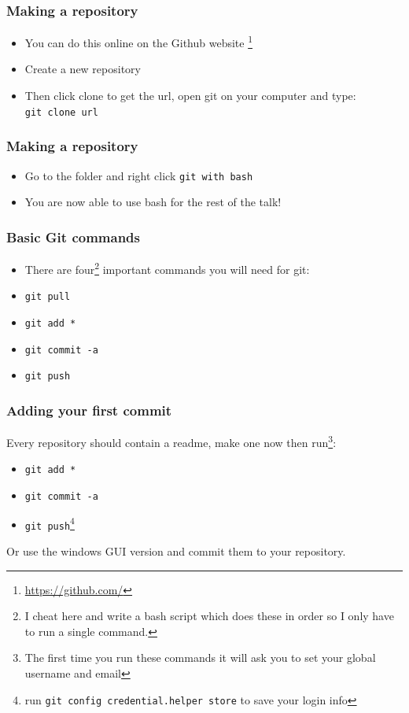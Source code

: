 \documentclass{beamer}
\begin{document}
\begin{frame}
\frametitle{Making a repository}
\begin{itemize}
\item You can do this online on the Github website \footnote{\url{https://github.com/}}
\item Create a new repository
\item Then click clone to get the url, open git on your computer and type: \\ 
	\texttt{git clone url}
\end{itemize}
\end{frame}

\begin{frame}
\frametitle{Making a repository}
\begin{itemize}
	\item Go to the folder and right click \texttt{git with bash}
\item You are now able to use bash for the rest of the talk!
\end{itemize}
\end{frame}

\begin{frame}
\frametitle{Basic Git commands}
\begin{itemize}
	\item There are four\footnote{I cheat here and write a bash script which does these in order so I only have to run a single command.} important commands you will need for git:
	\item \texttt{git pull}
	\item \texttt{git add *}
	\item \texttt{git commit -a}
	\item \texttt{git push}
\end{itemize}
\end{frame}

\begin{frame}
	\frametitle{Adding your first commit}
    Every repository should contain a readme, make one now then run\footnote{The first time you run these commands it will ask you to set your global username and email}:
\begin{itemize}
	\item \texttt{git add *}
	\item \texttt{git commit -a}
    \item \texttt{git push}\footnote{run \texttt{git config credential.helper store} to save your login info}
\end{itemize}

Or use the windows GUI version and commit them to your repository.

\end{frame}
\end{document}
